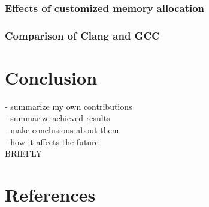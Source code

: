 \documentclass[12pt]{article}
\begin{document}
\subsubsection{Effects of customized memory allocation}



\subsubsection{Comparison of Clang and GCC}



\section{Conclusion}

\color{red}
- summarize my own contributions \\
- summarize achieved results \\
- make conclusions about them \\
- how it affects the future \\
BRIEFLY
\color{black}


\section{References}
\end{document}
